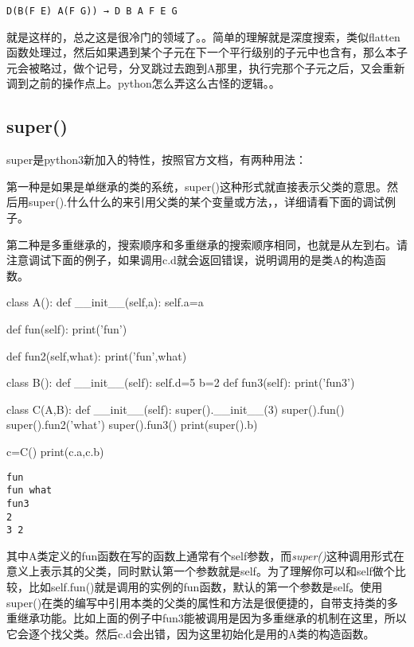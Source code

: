 \documentclass[12pt,oneside]{book}
\begin{document}
\begin{common-format}
\begin{Verbatim}
D(B(F E) A(F G)) → D B A F E G
\end{Verbatim}
就是这样的，总之这是很冷门的领域了。。简单的理解就是深度搜索，类似flatten函数处理过，然后如果遇到某个子元在下一个平行级别的子元中也含有，那么本子元会被略过，做个记号，分叉跳过去跑到A那里，执行完那个子元之后，又会重新调到之前的操作点上。python怎么弄这么古怪的逻辑。。



\subsection{super()}
super是python3新加入的特性，按照官方文档，有两种用法：

第一种是如果是单继承的类的系统，super()这种形式就直接表示父类的意思。然后用super().什么什么的来引用父类的某个变量或方法，，详细请看下面的调试例子。

第二种是多重继承的，搜索顺序和多重继承的搜索顺序相同，也就是从左到右。请注意调试下面的例子，如果调用c.d就会返回错误，说明调用的是类A的构造函数。

\begin{tcbpython}[]
class A():
    def __init__(self,a):
        self.a=a

    def fun(self):
        print('fun')

    def fun2(self,what):
        print('fun',what)

class B():
    def __init__(self):
        self.d=5
    b=2
    def fun3(self):
        print('fun3')

class C(A,B):
    def __init__(self):
        super().__init__(3)
        super().fun()
        super().fun2('what')
        super().fun3()
        print(super().b)

c=C()
print(c.a,c.b)
\end{tcbpython}

\begin{Verbatim}
fun
fun what
fun3
2
3 2
\end{Verbatim}


其中A类定义的fun函数在写的函数上通常有个self参数，而\emph{super()}这种调用形式在意义上表示其的父类，同时默认第一个参数就是self。为了理解你可以和self做个比较，比如self.fun()就是调用的实例的fun函数，默认的第一个参数是self。使用super()在类的编写中引用本类的父类的属性和方法是很便捷的，自带支持类的多重继承功能。比如上面的例子中fun3能被调用是因为多重继承的机制在这里，所以它会逐个找父类。然后c.d会出错，因为这里初始化是用的A类的构造函数。





\end{common-format}
\end{document}
